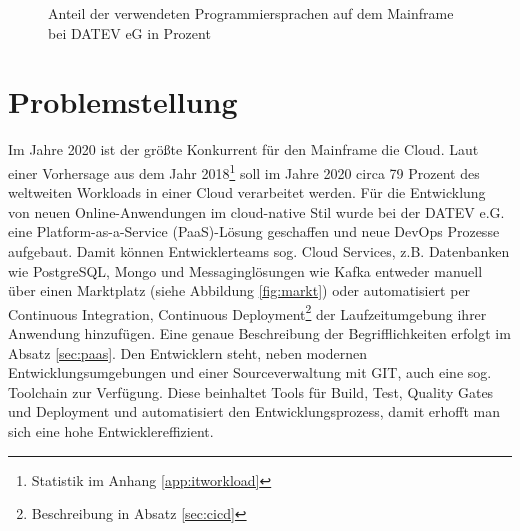 \begin{figure}
\centering
\caption{Anteil der verwendeten Programmiersprachen auf dem Mainframe bei DATEV eG in Prozent}
\label{fig:Programmiersprachen}
\end{figure}

\section{Problemstellung}\label{sec:probstell}
Im Jahre 2020 ist der größte Konkurrent für den Mainframe die Cloud.
Laut einer Vorhersage aus dem Jahr 2018\footnote{Statistik im Anhang \ref{app:itworkload}} soll im Jahre 2020 circa 79 Prozent des weltweiten Workloads in einer Cloud verarbeitet werden.
Für die Entwicklung von neuen Online-Anwendungen im cloud-native Stil wurde bei der DATEV e.G. eine Platform-as-a-Service (PaaS)-Lösung geschaffen und neue DevOps Prozesse aufgebaut. 
Damit können Entwicklerteams sog. \glqq Cloud Services\grqq, z.B. Datenbanken wie PostgreSQL, Mongo und Messaginglösungen wie Kafka entweder manuell über einen Marktplatz (siehe Abbildung \ref{fig:markt}) oder automatisiert per \glqq Continuous Integration, Continuous Deployment\grqq{}\footnote{Beschreibung in Absatz \ref{sec:cicd}} der Laufzeitumgebung ihrer Anwendung hinzufügen.
Eine genaue Beschreibung der Begrifflichkeiten erfolgt im Absatz \ref{sec:paas}.
Den Entwicklern steht, neben modernen Entwicklungsumgebungen und einer Sourceverwaltung mit GIT, auch eine sog. \glqq Toolchain\grqq{} zur Verfügung. Diese beinhaltet Tools für Build, Test, Quality Gates und Deployment und automatisiert den Entwicklungsprozess, damit erhofft man sich eine hohe Entwicklereffizient. 

